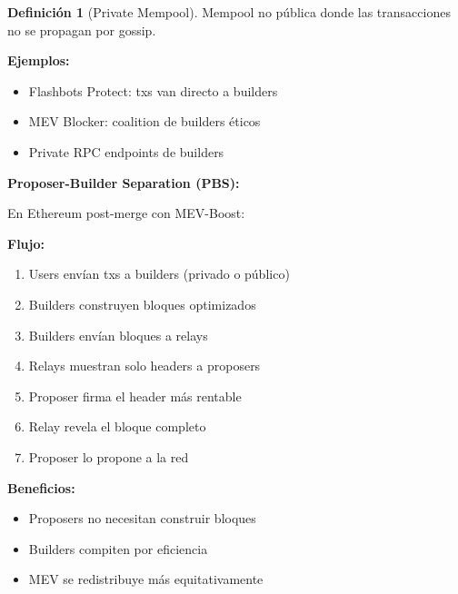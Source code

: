 \documentclass[11pt,a4paper,twoside,openright]{book}
\theoremstyle{definition}
\newtheorem{definition}{Definición}[chapter]
\theoremstyle{plain}
\theoremstyle{remark}
\begin{document}
\begin{definition}[Private Mempool]
Mempool no pública donde las transacciones no se propagan por gossip.

\textbf{Ejemplos:}
\begin{itemize}
    \item Flashbots Protect: txs van directo a builders
    \item MEV Blocker: coalition de builders éticos
    \item Private RPC endpoints de builders
\end{itemize}
\end{definition}

\begin{keyidea}
\textbf{Proposer-Builder Separation (PBS):}

En Ethereum post-merge con MEV-Boost:

\begin{center}
\end{center}

\textbf{Flujo:}
\begin{enumerate}
    \item Users envían txs a builders (privado o público)
    \item Builders construyen bloques optimizados
    \item Builders envían bloques a relays
    \item Relays muestran solo headers a proposers
    \item Proposer firma el header más rentable
    \item Relay revela el bloque completo
    \item Proposer lo propone a la red
\end{enumerate}

\textbf{Beneficios:}
\begin{itemize}
    \item Proposers no necesitan construir bloques
    \item Builders compiten por eficiencia
    \item MEV se redistribuye más equitativamente
\end{itemize}
\end{keyidea}
\end{document}

